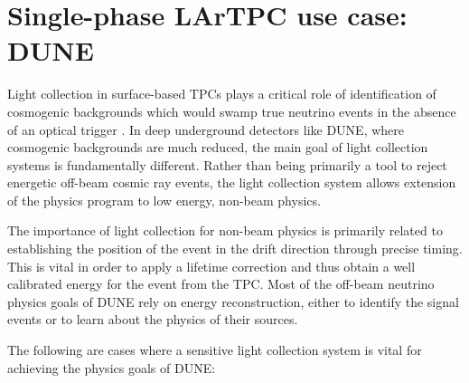 \section{Single-phase LArTPC use case: DUNE}

Light collection in surface-based TPCs plays a critical role of identification of cosmogenic backgrounds which would swamp true neutrino events in the absence of an optical trigger \cite{MicroBooNECosmic}. In deep underground detectors like DUNE, where cosmogenic backgrounds are much reduced, the main goal of light collection systems is fundamentally different. Rather than being primarily a tool to reject energetic off-beam cosmic ray events, the light collection system allows extension of the physics program to low energy, non-beam physics.

The importance of light collection for non-beam physics is primarily related to establishing the position of the event in the drift direction through precise timing.  This is vital in order to apply a lifetime correction and thus obtain a well calibrated energy for the event from the TPC.  Most of the off-beam neutrino physics goals of DUNE rely on energy reconstruction, either to identify the signal events or to learn about the physics of their sources.

The following are cases where a sensitive light collection system is vital for achieving the physics goals of DUNE:

